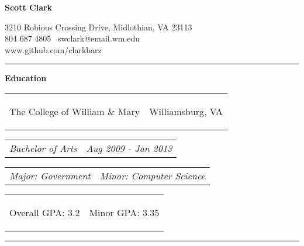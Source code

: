 \documentclass[11pt]{article}
\makeatletter
\newcommand{\headerrow}[2]
{\begin{tabular*}{\linewidth}{l@{\extracolsep{\fill}}r}
	#1 &
	#2 \\
\end{tabular*}}
\makeatother
\begin{document}
\begin{center}
	\begin{huge}
		\bf Scott Clark
	\end{huge}
	
	\large 3210 Robious Crossing Drive, Midlothian, VA 23113 \\
	\large 804 687 4805 \textbullet\  swclark@email.wm.edu \\
	\large www.github.com/clarkbarz
\end{center}


\hrule
\vspace{0.5em}

\begin{LARGE}
	\bf Education
\end{LARGE}

\vspace{0.5em}

\headerrow
	{\begin{Large}The College of William \& Mary\end{Large}}
	{Williamsburg, VA}
\headerrow
	{\textit{Bachelor of Arts}}
	{\textit{Aug 2009 - Jan 2013}}
\headerrow
	{\textit{Major: Government}}
	{\textit{Minor: Computer Science}}

\vspace{-0.9em}

\begin{center}
	\begin{tabular}{lr}
		\begin{large} Overall GPA: 3.2 \end{large} & \begin{large}Minor GPA: 3.35 \end{large} \\
	\end{tabular}
\end{center}


\vspace{-0.5em}
\hrule
\vspace{0.5em}
\end{document}
